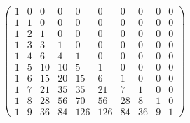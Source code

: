 \begin{displaymath} \left(\begin{array}{rrrrrrrrrr}
1 & 0 & 0 & 0 & 0 & 0 & 0 & 0 & 0 & 0 \\
1 & 1 & 0 & 0 & 0 & 0 & 0 & 0 & 0 & 0 \\
1 & 2 & 1 & 0 & 0 & 0 & 0 & 0 & 0 & 0 \\
1 & 3 & 3 & 1 & 0 & 0 & 0 & 0 & 0 & 0 \\
1 & 4 & 6 & 4 & 1 & 0 & 0 & 0 & 0 & 0 \\
1 & 5 & 10 & 10 & 5 & 1 & 0 & 0 & 0 & 0 \\
1 & 6 & 15 & 20 & 15 & 6 & 1 & 0 & 0 & 0 \\
1 & 7 & 21 & 35 & 35 & 21 & 7 & 1 & 0 & 0 \\
1 & 8 & 28 & 56 & 70 & 56 & 28 & 8 & 1 & 0 \\
1 & 9 & 36 & 84 & 126 & 126 & 84 & 36 & 9 & 1
\end{array}\right) \end{displaymath}